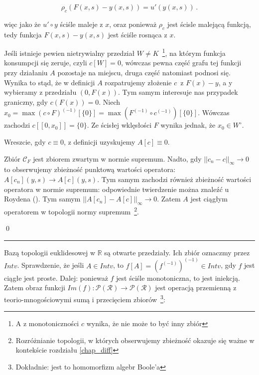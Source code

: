$$ \rho_c (F(x,s)-y(x,s))= u'(y(x,s))\,.$$

więc jako że $ u' \circ y $ ściśle maleje z $ x $, oraz ponieważ $ \rho_c $ jest ścisle malejącą funkcją, tedy funkcja $ F(x,s) - y(x,s) $ jest ściśle rosnąca z $ x $. 

Jeśli istnieje pewien nietrywialny przedział $ W \not = K$~\footnote{A z monotoniczności $ c $ wynika, że nie może to być inny zbiór}, na którym funkcja konsumpcji się zeruje, czyli $ c[W] = {0} $, wówczas pewna część grafu tej funkcji przy działaniu $ A $ pozostaje na miejscu, druga część natomiast podnosi się. Wynika to stąd, że w definicji $ A $ rozpatrujemy złożenie $ c $\, z $ F(x) - y $, a y wybieramy z przedziału $ (0, F(x)) $. Tym samym interesuje nas przypadek graniczny, gdy $ c(F(x)) = 0 $. Niech $ x_0 = \max (c\circ F)^{(-1)}[\{ 0\}] = \max (F^{(-1)} \circ c^{(-1)})[\{ 0\}]$. Wówczas zachodzi $ c[ [0,x_0] ] = \{0\}$. Ze ścisłej wklęsłości $ F $ wynika jednak, że $ x_0 \in W^{\circ} $. 

Wreszcie, gdy $ c \equiv 0 $, z definicji uzyskujemy $ A[c] \equiv 0$.

Zbiór $ \mathcal{C}_F $ jest zbiorem zwartym w normie supremum. Nadto, gdy $|| c_n - c ||_\infty \rightarrow 0$ to obserwujemy zbieżność punktową wartości operatora: $ A[c_n](y,s) \rightarrow A[c](y,s)$. Tym samym zachodzi również zbieżność wartości operatora w normie supremum: odpowiednie twierdzenie można znaleźć u Roydena (\citeyear[][lemat 39, str. 168]{Royden}). Tym samym $ || A[c_n] - A[c] ||_\infty \rightarrow 0 $. Zatem $ A $ jest ciągłym operatorem w topologii normy supremum~\footnote{Rozróżnianie topologii, w których obserwujemy zbieżność okazuje się ważne w kontekście rozdziału \ref{chap_diff}}.  

\qed
\newline

\hrule
\begin{dowod}\label{proof_homeomorphism}
\end{dowod}

	Bazą topologii euklidesowej w $ \mathbb{R} $ są otwarte przedziały. Ich zbiór oznaczmy przez $ Intv $. Sprawdzenie, że jeśli $ A \in Intv $, to $ f[A] = (f^{(-1)})^{(-1)} \in Intv $, gdy $ f $ jest ciągłe jest proste. Dalej: ponieważ $f$ jest ściśle monotoniczna, to jest iniekcją. Zatem obraz funkcji $ Im(f): \mathcal{P}(\mathcal{R}) \rightarrow \mathcal{P}(\mathcal{R}) $  jest operacją przemienną z teorio-mnogościowymi sumą i przecięciem zbiorów~\footnote{Dokładnie: jest to homomorfizm algebr Boole'a}:
	
